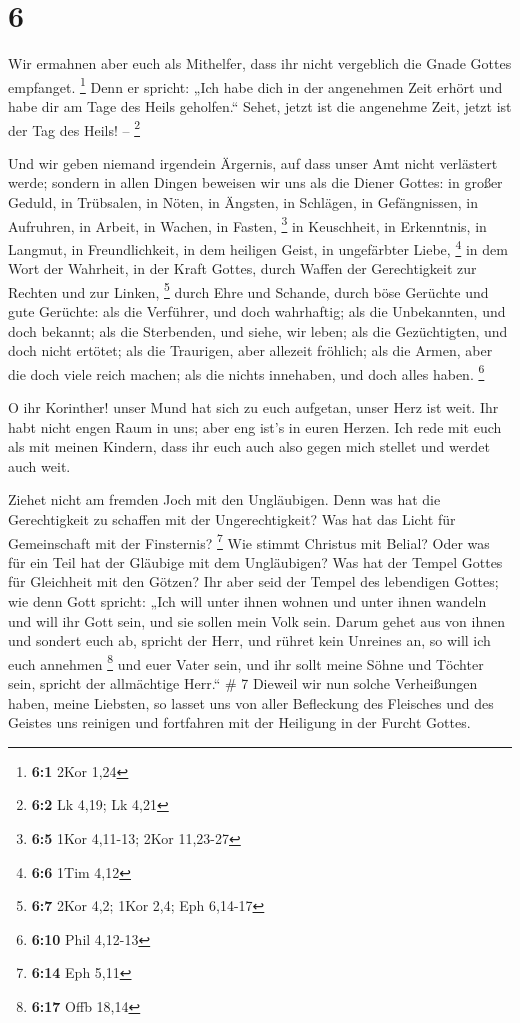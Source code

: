 \hypertarget{section-3}{%
\section{6}\label{section-3}}

 Wir ermahnen aber euch als Mithelfer, dass ihr nicht
vergeblich die Gnade Gottes empfanget. \footnote{\textbf{6:1} 2Kor 1,24}
 Denn er spricht: „Ich habe dich in der angenehmen Zeit
erhört und habe dir am Tage des Heils geholfen.`` Sehet, jetzt ist die
angenehme Zeit, jetzt ist der Tag des Heils! -- \footnote{\textbf{6:2}
  Lk 4,19; Lk 4,21}

 Und wir geben niemand irgendein Ärgernis, auf dass unser
Amt nicht verlästert werde;  sondern in allen Dingen
beweisen wir uns als die Diener Gottes: in großer Geduld, in Trübsalen,
in Nöten, in Ängsten,  in Schlägen, in Gefängnissen, in
Aufruhren, in Arbeit, in Wachen, in Fasten, \footnote{\textbf{6:5} 1Kor
  4,11-13; 2Kor 11,23-27}  in Keuschheit, in Erkenntnis, in
Langmut, in Freundlichkeit, in dem heiligen Geist, in ungefärbter Liebe,
\footnote{\textbf{6:6} 1Tim 4,12}  in dem Wort der Wahrheit,
in der Kraft Gottes, durch Waffen der Gerechtigkeit zur Rechten und zur
Linken, \footnote{\textbf{6:7} 2Kor 4,2; 1Kor 2,4; Eph 6,14-17}
 durch Ehre und Schande, durch böse Gerüchte und gute
Gerüchte: als die Verführer, und doch wahrhaftig;  als die
Unbekannten, und doch bekannt; als die Sterbenden, und siehe, wir leben;
als die Gezüchtigten, und doch nicht ertötet;  als die
Traurigen, aber allezeit fröhlich; als die Armen, aber die doch viele
reich machen; als die nichts innehaben, und doch alles haben.
\footnote{\textbf{6:10} Phil 4,12-13}

 O ihr Korinther! unser Mund hat sich zu euch aufgetan,
unser Herz ist weit.  Ihr habt nicht engen Raum in uns;
aber eng ist's in euren Herzen.  Ich rede mit euch als mit
meinen Kindern, dass ihr euch auch also gegen mich stellet und werdet
auch weit.

 Ziehet nicht am fremden Joch mit den Ungläubigen. Denn was
hat die Gerechtigkeit zu schaffen mit der Ungerechtigkeit? Was hat das
Licht für Gemeinschaft mit der Finsternis? \footnote{\textbf{6:14} Eph
  5,11}  Wie stimmt Christus mit Belial? Oder was für ein
Teil hat der Gläubige mit dem Ungläubigen?  Was hat der
Tempel Gottes für Gleichheit mit den Götzen? Ihr aber seid der Tempel
des lebendigen Gottes; wie denn Gott spricht: „Ich will unter ihnen
wohnen und unter ihnen wandeln und will ihr Gott sein, und sie sollen
mein Volk sein.  Darum gehet aus von ihnen und sondert euch
ab, spricht der Herr, und rühret kein Unreines an, so will ich euch
annehmen \footnote{\textbf{6:17} Offb 18,14}  und euer
Vater sein, und ihr sollt meine Söhne und Töchter sein, spricht der
allmächtige Herr.`` \# 7  Dieweil wir nun solche
Verheißungen haben, meine Liebsten, so lasset uns von aller Befleckung
des Fleisches und des Geistes uns reinigen und fortfahren mit der
Heiligung in der Furcht Gottes.

